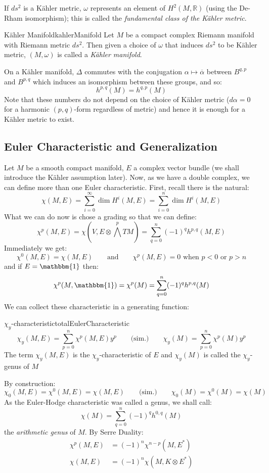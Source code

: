 \documentclass{book}
\newcommand{\R}{{\mathbb{R}}}
\begin{document}
If $ds^2$ is a K\"ahler metric, $\omega$ represents an element of $H^2(M, \R)$ (using the De-Rham
isomorphism); this is called the \emph{fundamental class of the K\"ahler metric}.

\begin{defn}{K\"ahler Manifold}{kahlerManifold}
  Let $M$ be a compact complex Riemann manifold with Riemann metric $ds^2$. Then given a choice of $\omega$ that
  induces $ds^2$ to be K\"ahler metric, $(M, \omega)$ is called a \emph{K\"ahler manifold}.
\end{defn}

On a K\"ahler manifold, $\Delta$ commutes with the conjugation $\alpha \mapsto \overline{\alpha}$ between
$B^{q,p}$ and $B^{p,q}$ which induces an isomorphism between these groups, and so:
\[
  h^{p,q}(M) = h^{q,p}(M)
\]
Note that these numbers do not depend on the choice of K\"ahler metric ($d\alpha = 0$ for a harmonic
$(p,q)$-form regardless of metric) and hence it is enough for a K\"ahler metric to exist.

\subsection{Euler Characteristic and Generalization}

Let $M$ be a smooth compact manifold, $E$ a complex vector bundle (we shall introduce the K\"ahler assumption
later). Now, as we have a double complex, we can
define more than one Euler characteristic. First, recall there is the natural:
\[
  \chi(M,E) = \sum_{i=0}^\infty \dim H^i(M,E) = \sum_{i=0}^n \dim H^i(M,E)
\]
What we can do now is chose a grading so that we can define:
\[
  \chi^p(M,E) = \chi\left(V, E\otimes \bigwedge^p TM\right) = \sum_{q=0}^n (-1)^q h^{p,q}(M,E)
\]
Immediately we get:
\[
  \chi^0(M,E) = \chi(M,E) \qquad \text{and} \qquad \chi^p(M,E) = 0\text{ when $p < 0$ or $p > n$}
\]
and if $E = \mathbbm{1}$ then:
\[
  \chi^p(M,\mathbbm{1}) = \chi^p(M) = \sum_{q=0}^n (-1)^q h^{p,q}(M)
\]
We can collect these characteristic in a generating function:
\begin{defn}{$\chi_y$-characteristic}{totalEulerCharacteristic}
    \[
    \chi_y(M,E) = \sum_{p=0}^n \chi^p(M,E)y^p \qquad \text{(sim.)} \qquad \chi_y(M) = \sum_{p=0}^n \chi^p(M)y^p
  \]
  The term $\chi_y(M,E)$ is the $\chi_y$-characteristic of $E$ and $\chi_y(M)$ is called the $\chi_y$-genus of
  $M$
\end{defn}

By construction:
\[
  \chi_0(M,E) = \chi^0(M,E) = \chi(M,E) \qquad \text{(sim.)} \qquad \chi_0(M) = \chi^0(M) = \chi(M)
\]
As the Euler-Hodge characteristic was called a genus, we shall call:
\[
  \chi(M) = \sum_{q=0}^n (-1)^q h^{0,q}(M)
\]
the \emph{arithmetic genus} of $M$. By Serre Duality:
\begin{align*}
  \chi^p(M,E) &= (-1)^n \chi^{n-p}(M, E^*)\\
  \chi(M,E)&= (-1)^n \chi(M, K\otimes E^*)
\end{align*}
\end{document}
